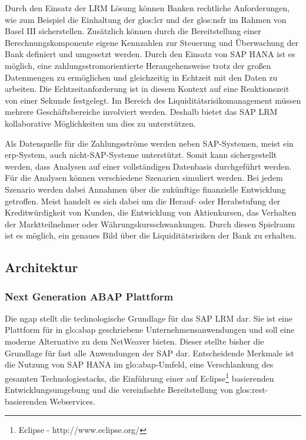 \begin{onehalfspacing}
Durch den Einsatz der LRM Lösung können Banken rechtliche Anforderungen, wie zum Beispiel die Einhaltung der \gls{glos:lcr} und der \gls{glos:nsfr} im Rahmen von Basel III sicherstellen. Zusätzlich können durch die Bereitstellung einer Berechnungskomponente eigene Kennzahlen zur Steuerung und Überwachung der Bank definiert und umgesetzt werden. Durch den Einsatz von SAP HANA ist es möglich, eine zahlungsstromorientierte Herangehensweise trotz der großen Datenmengen zu ermöglichen und gleichzeitig in Echtzeit mit den Daten zu arbeiten. Die Echtzeitanforderung ist in diesem Kontext auf eine Reaktionszeit von einer Sekunde festgelegt. Im Bereich des Liquiditätsrisikomanagement müssen mehrere Geschäftsbereiche involviert werden. Deshalb bietet das SAP LRM kollaborative Möglichkeiten um dies zu unterstützen.

Als Datenquelle für die Zahlungsströme werden neben SAP-Systemen, meist ein \gls{erp}-System, auch nicht-SAP-Systeme unterstützt. Somit kann sichergestellt werden, dass Analysen auf einer vollständigen Datenbasis durchgeführt werden. Für die Analysen können verschiedene Szenarien simuliert werden. Bei jedem Szenario werden dabei Annahmen über die zukünftige finanzielle Entwicklung getroffen. Meist handelt es sich dabei um die Herauf- oder Herabstufung der Kreditwürdigkeit von Kunden, die Entwicklung von Aktienkursen, das Verhalten der Marktteilnehmer oder Währungskursschwankungen. Durch diesen Spielraum ist es möglich, ein genaues Bild über die Liquiditätsrisiken der Bank zu erhalten.


\subsection{Architektur}

\subsubsection{Next Generation ABAP Plattform}
Die \gls{ngap} stellt die technologische Grundlage für das SAP LRM dar. Sie ist eine Plattform für in \gls{glo:abap} geschriebene Unternehmensanwendungen und soll eine moderne Alternative zu dem \gls{NetWeaver} bieten. Dieser stellte bisher die Grundlage für fast alle Anwendungen der SAP dar. Entscheidende Merkmale ist die Nutzung von SAP HANA im \gls{glo:abap}-Umfeld, eine Verschlankung des gesamten Technologiestacks, die Einführung einer auf Eclipse\footnote{Eclipse - http://www.eclipse.org/} basierenden Entwicklungsumgebung und die vereinfachte Bereitstellung von \gls{glos:rest}-basierenden Webservices.


\end{onehalfspacing}

